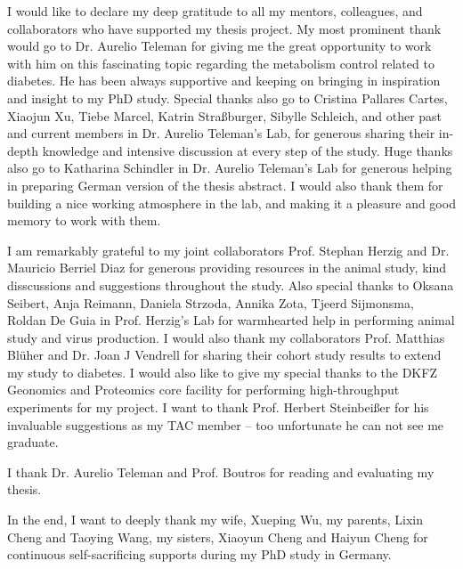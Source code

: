 I would like to declare my deep gratitude to all my mentors, colleagues, and collaborators who have supported my thesis project. My most prominent thank would go to Dr. Aurelio Teleman for giving me the great opportunity to work with him on this fascinating topic regarding the metabolism control related to diabetes. He has been always supportive and keeping on bringing in inspiration and insight to my PhD study. Special thanks also go to Cristina Pallares Cartes, Xiaojun Xu, Tiebe Marcel, Katrin Stra{\ss}burger, Sibylle Schleich, and other past and current members in Dr. Aurelio Teleman's Lab, for generous sharing their in-depth knowledge and intensive discussion at every step of the study. Huge thanks also go to Katharina Schindler in Dr. Aurelio Teleman's Lab for generous helping in preparing German version of the thesis abstract. I would also thank them for building a nice working atmosphere in the lab, and making it a pleasure and good memory to work with them. 

I am remarkably grateful to my joint collaborators Prof. Stephan Herzig and Dr. Mauricio Berriel Diaz for generous providing resources in the animal study, kind disscussions and suggestions throughout the study. Also special thanks to Oksana Seibert, Anja Reimann, Daniela Strzoda, Annika Zota, Tjeerd Sijmonsma, Roldan De Guia in Prof. Herzig's Lab for warmhearted help in performing animal study and virus production. I would also thank my collaborators Prof. Matthias Bl\"uher and Dr. Joan J Vendrell for sharing their cohort study results to extend my study to diabetes. I would also like to give my special thanks to the DKFZ Geonomics and Proteomics core facility for performing high-throughput experiments for my project. I want to thank Prof. Herbert Steinbei{\ss}er for his invaluable suggestions as my TAC member -- too unfortunate he can not see me graduate.

I thank Dr. Aurelio Teleman and Prof. Boutros for reading and evaluating my thesis.

In the end, I want to deeply thank my wife, Xueping Wu, my parents, Lixin Cheng and Taoying Wang, my sisters, Xiaoyun Cheng and Haiyun Cheng for continuous self-sacrificing supports during my PhD study in Germany. 


